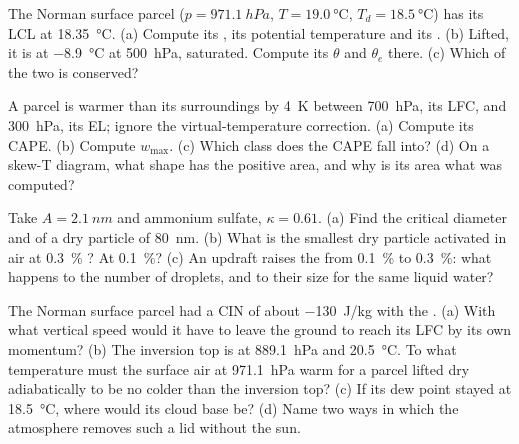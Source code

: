 \begin{exercise}[$\star\star$]\label{exo:b2:atmospheric-thermodynamics:7}
The Norman surface parcel ($p = \qty{971.1}{hPa}$, $T = \qty{19.0}{\celsius}$, $T_d =
\qty{18.5}{\celsius}$) has its LCL at \qty{18.35}{\celsius}. (a) Compute its , its
potential temperature and its . (b) Lifted, it is at
\qty{-8.9}{\celsius} at \qty{500}{hPa}, saturated. Compute its $\theta$ and $\theta_e$ there.
(c) Which of the two is conserved?
\end{exercise}

\begin{exercise}[$\star\star$]\label{exo:b2:atmospheric-thermodynamics:8}
A parcel is warmer than its surroundings by \qty{4}{K} between \qty{700}{hPa}, its LFC, and
\qty{300}{hPa}, its EL; ignore the virtual-temperature correction. (a) Compute its CAPE. (b)
Compute $w_{\max}$. (c) Which class does the CAPE fall into? (d) On a skew-T diagram, what
shape has the positive area, and why is its area what was computed?
\end{exercise}

\begin{exercise}[$\star\star$]\label{exo:b2:atmospheric-thermodynamics:9}
Take $A = \qty{2.1}{nm}$ and ammonium sulfate, $\kappa = 0.61$. (a) Find the critical diameter
and  of a dry particle of \qty{80}{nm}. (b) What is the smallest dry particle
activated in air at \qty{0.3}{\percent} ? At \qty{0.1}{\percent}? (c) An updraft
raises the  from \qty{0.1}{\percent} to \qty{0.3}{\percent}: what happens to the
number of droplets, and to their size for the same liquid water?
\end{exercise}

\begin{exercise}[$\star\star\star$]\label{exo:b2:atmospheric-thermodynamics:10}
The Norman surface parcel had a CIN of about \qty{-130}{J/kg} with the .
(a) With what vertical speed would it have to leave the ground to reach its LFC by its own
momentum? (b) The inversion top is at \qty{889.1}{hPa} and \qty{20.5}{\celsius}. To what
temperature must the surface air at \qty{971.1}{hPa} warm for a parcel lifted dry
adiabatically to be no colder than the inversion top? (c) If its dew point stayed at
\qty{18.5}{\celsius}, where would its cloud base be? (d) Name two ways in which the atmosphere
removes such a lid without the sun.
\end{exercise}

